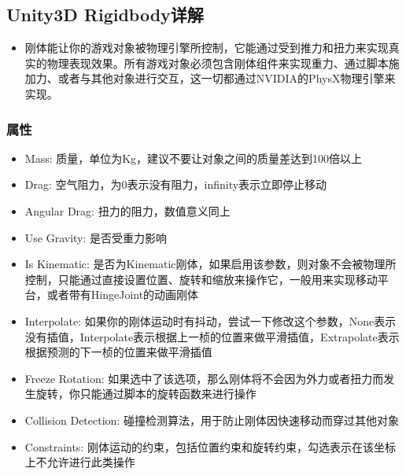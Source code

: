 \documentclass[9pt, b5paper]{article}
\begin{document}
\subsection{Unity3D Rigidbody详解}
\label{sec:orgf260480}
\begin{itemize}
\item 刚体能让你的游戏对象被物理引擎所控制，它能通过受到推力和扭力来实现真实的物理表现效果。所有游戏对象必须包含刚体组件来实现重力、通过脚本施加力、或者与其他对象进行交互，这一切都通过NVIDIA的PhysX物理引擎来实现。
\end{itemize}
\subsubsection{属性}
\label{sec:org4a83fbe}
\begin{itemize}
\item Mass: 质量，单位为Kg，建议不要让对象之间的质量差达到100倍以上
\item Drag: 空气阻力，为0表示没有阻力，infinity表示立即停止移动
\item Angular Drag: 扭力的阻力，数值意义同上
\item Use Gravity: 是否受重力影响
\item Is Kinematic: 是否为Kinematic刚体，如果启用该参数，则对象不会被物理所控制，只能通过直接设置位置、旋转和缩放来操作它，一般用来实现移动平台，或者带有HingeJoint的动画刚体
\item Interpolate: 如果你的刚体运动时有抖动，尝试一下修改这个参数，None表示没有插值，Interpolate表示根据上一桢的位置来做平滑插值，Extrapolate表示根据预测的下一桢的位置来做平滑插值
\item Freeze Rotation: 如果选中了该选项，那么刚体将不会因为外力或者扭力而发生旋转，你只能通过脚本的旋转函数来进行操作
\item Collision Detection: 碰撞检测算法，用于防止刚体因快速移动而穿过其他对象
\item Constraints: 刚体运动的约束，包括位置约束和旋转约束，勾选表示在该坐标上不允许进行此类操作
\end{itemize}
\end{document}
